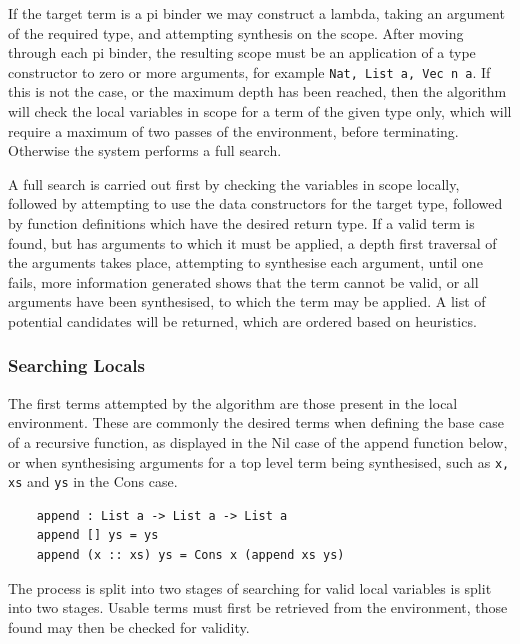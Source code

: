 \documentclass[a4paper]{article}
\begin{document}
If the target term is a pi binder we may construct a lambda, taking an
argument of the required type, and attempting synthesis on the scope. After moving through each pi binder, the resulting scope must be an application of a type constructor to zero or more
arguments, for example \texttt{Nat, List a, Vec n a}. If this is not the case, or the maximum
depth has been reached, then the algorithm will check the local 
variables in scope for a term of the given type only, which will require a maximum of two passes of the environment,
before terminating. Otherwise the system performs a full search.

A full search is carried out first by checking the  variables in scope locally, followed by
attempting to use the data constructors for the target type, followed by function definitions which have
the desired return type. If a valid term is found, but has arguments to which it must be applied, a depth first traversal
of the arguments takes place, attempting to synthesise each argument, until one fails, more information generated
shows that the term cannot be valid, or all arguments have been synthesised, to which the term may be applied.
A list of potential candidates will be returned, which are ordered based on heuristics.

\subsubsection{Searching Locals}
\label{sec:orgbc2d082}

The first terms attempted by the algorithm are those present in the local environment.
These are commonly the desired terms when defining the base case of a
recursive function, as displayed in the Nil case of the append function below,
or when synthesising arguments for a top level term being synthesised,
such as \texttt{x, xs} and \texttt{ys} in the Cons case.

\begin{center}
  \begin{verbatim}
    append : List a -> List a -> List a
    append [] ys = ys
    append (x :: xs) ys = Cons x (append xs ys) 
  \end{verbatim}
\end{center}

The process is split into two stages of searching for valid local
variables is split into two stages. Usable terms must first be retrieved
from the environment, those found may then be checked for validity.
\end{document}
